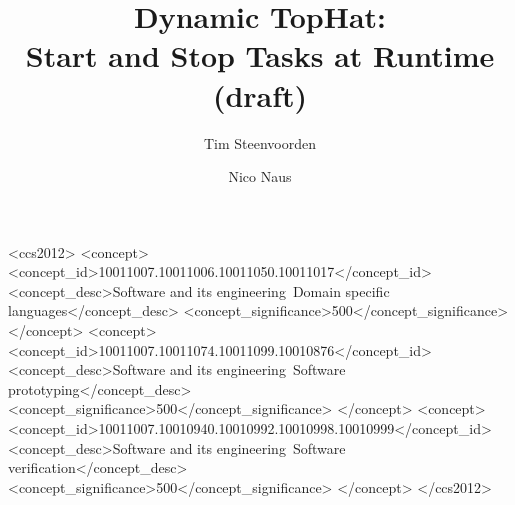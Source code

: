 \documentclass[sigconf,screen,review]{acmart}
\begin{document}
\title[Dynamic TopHat]{Dynamic TopHat:\\ Start and Stop Tasks at Runtime (draft)}

\author{Tim Steenvoorden}

\author{Nico Naus}

\renewcommand{\shortauthors}{Steenvoorden and Naus}

\begin{abstract}

  

\end{abstract}

\begin{CCSXML}
<ccs2012>
   <concept>
       <concept_id>10011007.10011006.10011050.10011017</concept_id>
       <concept_desc>Software and its engineering~Domain specific languages</concept_desc>
       <concept_significance>500</concept_significance>
       </concept>
   <concept>
       <concept_id>10011007.10011074.10011099.10010876</concept_id>
       <concept_desc>Software and its engineering~Software prototyping</concept_desc>
       <concept_significance>500</concept_significance>
       </concept>
   <concept>
       <concept_id>10011007.10010940.10010992.10010998.10010999</concept_id>
       <concept_desc>Software and its engineering~Software verification</concept_desc>
       <concept_significance>500</concept_significance>
       </concept>
 </ccs2012>
\end{CCSXML}
\end{document}
